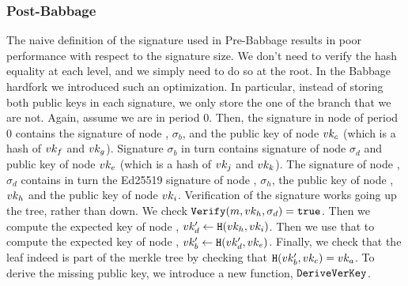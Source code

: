 \subsubsection{Post-Babbage}
The naive definition of the
signature used in Pre-Babbage results in poor performance with respect to the signature size. We
don't need to verify the hash equality at each level, and we simply need to do so at the root. In the Babbage
hardfork we introduced such an optimization. In particular, instead of storing both public keys in each signature, we
only store the one of the branch that we are not. Again, assume we are in period 0. Then, the signature in node  of
period 0 contains the signature of node , $\sigma_b$, and the public key of node  $vk_c$
(which is a hash of $vk_f$ and $vk_g$). Signature $\sigma_b$ in turn contains signature of node 
$\sigma_d$ and public key of node  $vk_e$ (which is a hash of $vk_j$ and $vk_k$). The signature of
node , $\sigma_d$ contains in turn the Ed25519 signature of node , $\sigma_h$, the public key
of node , $vk_h$ and the public key of node  $vk_i$. Verification of the signature works
going up the tree, rather than down. We check $\texttt{Verify}(m, vk_h, \sigma_d) = \texttt{true}$. Then we compute the expected
key of node , $vk_d'\gets\texttt{H}(vk_h, vk_i)$. Then we use that to compute the expected key of node
, $vk_b'\gets\texttt{H}(vk_d', vk_e)$. Finally, we check that the leaf indeed is part of the merkle tree by
checking that $\texttt{H}(vk_b', vk_c) = vk_a$. To derive the missing public key, we introduce a new function, $\texttt{DeriveVerKey}$.

